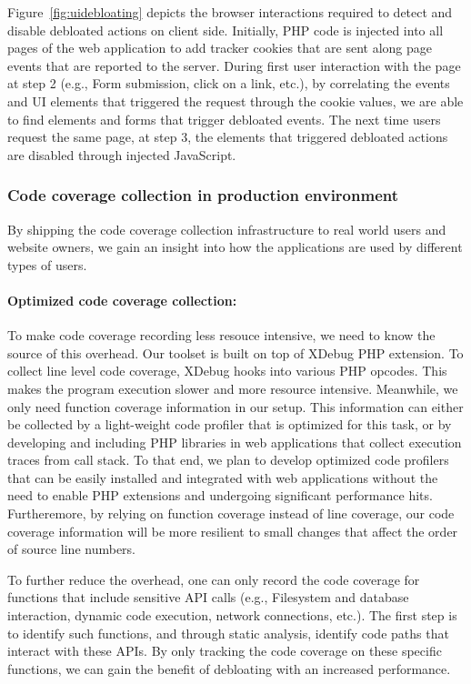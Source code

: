 Figure~\ref{fig:uidebloating} depicts the browser interactions required to detect and disable debloated actions on client side. Initially, PHP code is injected into all pages of the web application to add tracker cookies that are sent along page events that are reported to the server. During first user interaction with the page at step 2 (e.g., Form submission, click on a link, etc.), by correlating the events and UI elements that triggered the request through the cookie values, we are able to find elements and forms that trigger debloated events. The next time users request the same page, at step 3, the elements that triggered debloated actions are disabled through injected JavaScript.

\subsubsection{Code coverage collection in production environment}
By shipping the code coverage collection infrastructure to real world users and website owners, we gain an insight into how the applications are used by different types of users.

\paragraph{Optimized code coverage collection:} To make code coverage recording less resouce intensive, we need to know the source of this overhead.
Our toolset is built on top of XDebug PHP extension. To collect line level code coverage, XDebug hooks into various PHP opcodes. This makes the program execution slower and more resource intensive. Meanwhile, we only need function coverage information in our setup. This information can either be collected by a light-weight code profiler that is optimized for this task, or by developing and including PHP libraries in web applications that collect execution traces from call stack. To that end, we plan to develop optimized code profilers that can be easily installed and integrated with web applications without the need to enable PHP extensions and undergoing significant performance hits. Furtheremore, by relying on function coverage instead of line coverage, our code coverage information will be more resilient to small changes that affect the order of source line numbers.

To further reduce the overhead, one can only record the code coverage for functions that include sensitive API calls (e.g., Filesystem and database interaction, dynamic code execution, network connections, etc.). The first step is to identify such functions, and through static analysis, identify code paths that interact with these APIs. By only tracking the code coverage on these specific functions, we can gain the benefit of debloating with an increased performance.

